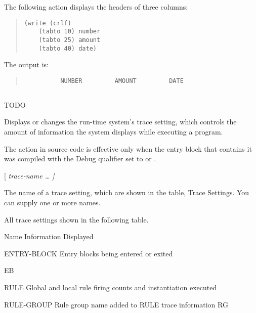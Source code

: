 {{\Example

The following  action displays the headers of three
columns:
\begin{quote}
\begin{verbatim}
(write (crlf) 
    (tabto 10) number
    (tabto 25) amount
    (tabto 40) date)
\end{verbatim}
\end{quote}
     
The output is:
\begin{quote}
\begin{verbatim}
          NUMBER         AMOUNT         DATE
\end{verbatim}
\end{quote}

\subsection{}
TODO

Displays or changes the run-time system's trace setting, which
controls the amount of information the system displays while executing
a program.

\begin{note}
  The  action in source code is effective only when the entry
  block that contains it was compiled with the Debug qualifier set to
   or .
\end{note}

\Format

 [ \it{trace-name} \ldots {} \co{*}]

\begin{arguments}
\item[trace-name]

  The name of a trace setting, which are shown in the table, Trace
  Settings. You can supply one or more names.

\item[*]

  All trace settings shown in the following table.
\end{arguments}

Name  Information Displayed

{ENTRY-BLOCK}  Entry blocks being entered or exited

{EB}

RULE  Global and local rule firing counts and instantiation
executed

{RULE-GROUP} Rule group name added to RULE trace information
{RG}

}}
